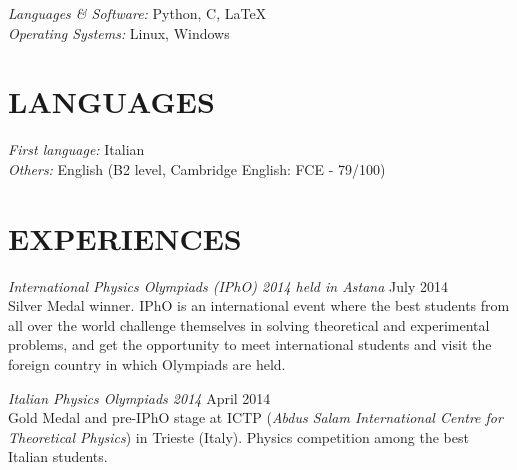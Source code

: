 \documentclass[margin, 10pt]{res} %
\begin{document}
\begin{resume}

{\sl Languages \& Software:} 
Python, C, \LaTeX \\
{\sl Operating Systems:} Linux, Windows


\section{LANGUAGES} 

{\sl First language:} Italian\\
{\sl Others:} English (B2 level, Cambridge English: FCE - 79/100)


 
\section{EXPERIENCES}



{\sl International Physics Olympiads (IPhO) 2014 held in Astana} \hfill July 2014\\
Silver Medal winner. IPhO is an international event where the best students from all over the world challenge themselves in solving theoretical and experimental problems, and get the opportunity to meet international students and visit the foreign country in which Olympiads are held.

{\sl Italian Physics Olympiads 2014} \hfill April 2014\\
Gold Medal and pre-IPhO stage at ICTP (\textit{Abdus Salam International Centre for Theoretical Physics}) in Trieste (Italy). Physics competition among the best Italian students. 


\end{resume}
\end{document}

